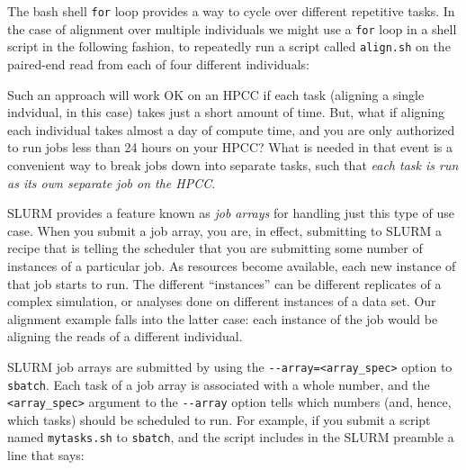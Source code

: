 \documentclass[]{krantz}
\makeatletter
\newenvironment{Shaded}{\begin{snugshade}}{\end{snugshade}}
\newcommand{\ExtensionTok}[1]{#1}
\newcommand{\KeywordTok}[1]{\textcolor[rgb]{0.27,0.27,0.27}{\textbf{#1}}}
\newcommand{\NormalTok}[1]{#1}
\newcommand{\StringTok}[1]{\textcolor[rgb]{0.5,0.5,0.5}{#1}}
\newcommand{\VariableTok}[1]{\textcolor[rgb]{0,0,0}{#1}}
\newenvironment{kframe}{%
\medskip{}
\setlength{\fboxsep}{.8em}
 \def\at@end@of@kframe{}%
 \ifinner\ifhmode%
  \def\at@end@of@kframe{\end{minipage}}%
  \begin{minipage}{\columnwidth}%
 \fi\fi%
 \def\FrameCommand##1{\hskip\@totalleftmargin \hskip-\fboxsep
 \colorbox{shadecolor}{##1}\hskip-\fboxsep
     \hskip-\linewidth \hskip-\@totalleftmargin \hskip\columnwidth}%
 \MakeFramed {\advance\hsize-\width
   \@totalleftmargin\z@ \linewidth\hsize
   \@setminipage}}%
 {\par\unskip\endMakeFramed%
 \at@end@of@kframe}
\renewenvironment{Shaded}{\begin{kframe}}{\end{kframe}}
\makeatother
\begin{document}
The bash shell \texttt{for} loop provides a way to cycle over different repetitive tasks.
In the case of alignment over multiple individuals we might use a \texttt{for} loop
in a shell script in the following fashion, to repeatedly run a script
called \texttt{align.sh} on the paired-end read from each of four different individuals:

\begin{Shaded}
\end{Shaded}

Such an approach will work OK on an HPCC if each task (aligning a single indvidual,
in this case) takes just a short amount of time. But, what if aligning each
individual takes almost a day of compute time, and you are only authorized to
run jobs less than 24 hours on your HPCC? What is needed in that event is a convenient
way to break jobs down into separate tasks, such that \emph{each task is run as its own
separate job on the HPCC}.

SLURM provides a feature known as \emph{job arrays} for handling just this type of use
case. When you submit a job array, you are, in effect, submitting to SLURM a recipe
that is telling the scheduler that you are submitting some number of instances of a particular
job. As resources become available, each new instance of that job starts to run. The
different ``instances'' can be different replicates of a complex simulation, or analyses done
on different instances of a data set. Our alignment example falls into the latter case: each
instance of the job would be aligning the reads of a different individual.

SLURM job arrays are submitted by using the \texttt{-\/-array=\textless{}array\_spec\textgreater{}} option to \texttt{sbatch}.
Each task of a job array is associated with a whole number, and the
\texttt{\textless{}array\_spec\textgreater{}} argument to the \texttt{-\/-array} option tells which numbers (and, hence,
which tasks) should be scheduled to run. For example, if you submit a script
named \texttt{mytasks.sh} to \texttt{sbatch},
and the script includes in the SLURM preamble a line that says:
\end{document}
